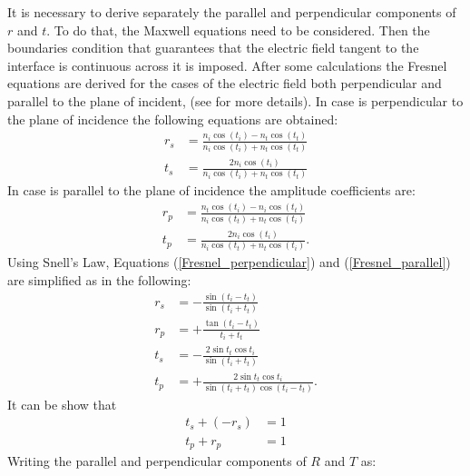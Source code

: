 It is necessary to derive separately the parallel and perpendicular components of $r$ and $t$. 
To do that, the Maxwell equations need to be considered. 
Then the boundaries condition that guarantees that the electric field  tangent to the interface is continuous across it is imposed. 
After some calculations the Fresnel equations are derived for the cases of the electric field both perpendicular and parallel to the plane of incident, (see  \cite{born2013principles, hecht1998hecht} for more details). In case  is perpendicular to the plane of incidence the following equations are obtained:
\begin{equation} \label{Fresnel_perpendicular}
\begin{split}
r_{s} & = \frac{n_i\cos(t_i)-n_t \cos(t_t)}{n_i \cos(t_i)+n_t\cos(t_t)}\\
t_{s} & =  \frac{2n_i\cos(t_i)}{n_i\cos(t_i)+n_t\cos(t_t)}
\end{split}
\end{equation}
In case  is parallel to the plane of incidence the amplitude coefficients are:
\begin{equation}\label{Fresnel_parallel}
\begin{split}
r_{p} & = \frac{n_t\cos(t_i)-n_i \cos(t_t)}{n_i \cos(t_t)+n_t\cos(t_i)}\\
t_{p} & =  \frac{2n_i\cos(t_i)}{n_i\cos(t_t)+n_t\cos(t_i)}.
\end{split}
\end{equation}
Using Snell's Law,  Equations (\ref{Fresnel_perpendicular}) and (\ref{Fresnel_parallel}) are simplified as in the following:
\begin{equation} \label{simple_Fresnel}
\begin{split}
r_{s} & = -\frac{\sin(t_i-t_t)}{\sin(t_i+t_t)}\\
r_{p} & =  +\frac{\tan(t_i-t_t)}{t_i+t_t}\\
t_{s} & = -\frac{2\sin t_t \cos t_i}{\sin(t_i+t_t)}\\
t_{p} & = +\frac{2\sin t_t \cos t_i}{\sin(t_i+t_t)\cos(t_i- t_t)}.
\end{split}
\end{equation}
It can be show that
 \begin{equation}
\begin{split}
t_s+(-r_s) &= 1 \\
t_p+r_p &=  1
\end{split}
\end{equation}
Writing the parallel and perpendicular components of $R$ and $T$ as:
